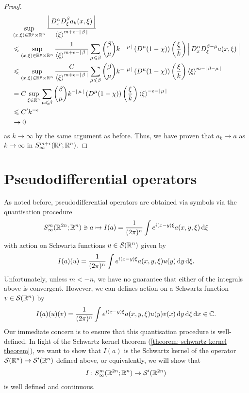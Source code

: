 \documentclass[12pt]{article}
\begin{document}
\begin{proof}
\begin{align*}
        &\sup_{(x, \xi) \in \R^p \times \R^n} \frac{\abs{D^\alpha_x D^\beta_\xi a_k(x, \xi)}}{\sym[\xi]^{m + \epsilon - \abs{\beta}}} \\
        & \leq \sup_{(x, \xi) \in \R^p \times \R^n} \frac{1}{\sym[\xi]^{m + \epsilon - \abs{\beta}}} \sum_{\mu \leq \beta} \binom{\beta}{\mu}k^{-\abs{\mu}} \brac{D^\mu (1 - \chi)}\brac{\frac{\xi}{k}} \abs{D^\alpha_x D^{\beta - \mu}_\xi a(x, \xi) } \\
        & \leq  \sup_{(x, \xi) \in \R^p \times \R^n} \frac{C}{\sym[\xi]^{m + \epsilon - \abs{\beta}}} \sum_{\mu \leq \beta} \binom{\beta}{\mu}k^{-\abs{\mu}} \brac{D^\mu (1 - \chi)}\brac{\frac{\xi}{k}} \sym[\xi]^{m - \abs{\beta - \mu}}  \\
        & = C \sup_{\xi \in \R^n} \sum_{\mu \leq \beta} \binom{\beta}{\mu}k^{-\abs{\mu}} \brac{D^\mu (1 - \chi)}\brac{\frac{\xi}{k}} \sym[\xi]^{- \epsilon - \abs{\mu}}  \\
        & \leq C' k^{- \epsilon} \\
        & \to 0
    \end{align*}
    as $k \to \infty$ by the same argument as before. Thus, we have proven that $a_k \to a$ as $k \to \infty$ in $S^{m + \epsilon}_\infty(\R^p; \R^n)$. 
    
\end{proof}




\section{Pseudodifferential operators}

As noted before, pseudodifferential operators are obtained via symbols via the quantisation procedure
\begin{align}
    S^{m}_\infty(\R^{2n}; \R^n) \ni a \mapsto I(a) = \frac{1}{(2\pi)^n} \int e^{i(x- y)\xi} a(x, y, \xi) \d[\xi]
\end{align}
with action on Schwartz functions $u \in \sch(\R^n)$ given by 
\begin{align} \label{eq: oscillatory integral}
    I(a)(u) =  \frac{1}{(2\pi)^n} \int e^{i(x- y)\xi} a(x, y, \xi) u(y) \d[y] \d[\xi]. 
\end{align}
Unfortunately, unless $m < -n$, we have no guarantee that either of the integrals above is convergent. However, we can defines action on a Schwartz function $v \in \sch(\R^n)$ by
\begin{align}
    I(a)(u)(v) = \frac{1}{(2\pi)^n} \int e^{i(x- y)\xi} a(x, y, \xi) u(y) v(x) \d[y] \d[\xi] \d[x] \in \C.  
\end{align}
Our immediate concern is to ensure that this quantisation procedure is well-defined. In light of the Schwartz kernel theorem (\ref{theorem: schwartz kernel theorem}), we want to show that $I(a)$ is the Schwartz kernel of the operator $\sch(\R^n) \to \sch'(\R^n)$ defined above, or equivalently, we will show that 
\begin{align*}
I : S^{m}_\infty(\R^{2n}; \R^n) \to \sch'(\R^{2n})
\end{align*}
is well defined and continuous. \\
\end{document}
